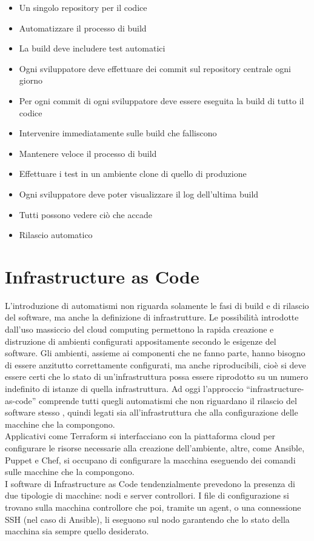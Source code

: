 \documentclass[a4paper, 12pt]{report}
\numberwithin{equation}{section}
\begin{document}
\begin{itemize}
    \item Un singolo repository per il codice
    \item Automatizzare il processo di build
    \item La build deve includere test automatici
    \item Ogni sviluppatore deve effettuare dei commit sul repository centrale ogni giorno
    \item Per ogni commit di ogni sviluppatore deve essere eseguita la build di tutto il codice
    \item Intervenire immediatamente sulle build che falliscono
    \item Mantenere veloce il processo di build
    \item Effettuare i test in un ambiente clone di quello di produzione
    \item Ogni sviluppatore deve poter visualizzare il log dell'ultima build
    \item Tutti possono vedere ciò che accade
    \item Rilascio automatico
\end{itemize}
\section{Infrastructure as Code}
L’introduzione di automatismi non riguarda solamente le fasi di build e di rilascio del software, ma anche la definizione di infrastrutture. Le possibilità introdotte dall’uso massiccio del cloud computing permettono la rapida creazione e distruzione di ambienti configurati appositamente secondo le esigenze del software. Gli ambienti, assieme ai componenti che ne fanno parte, hanno bisogno di essere anzitutto correttamente configurati, ma anche riproducibili, cioè si deve essere certi che lo stato di un’infrastruttura possa essere riprodotto su un numero indefinito di istanze di quella infrastruttura.
Ad oggi l'approccio “infrastructure-as-code” comprende tutti quegli automatismi che non riguardano il rilascio del software stesso \cite{hutterman-iac}, quindi legati sia all'infrastruttura che alla configurazione delle macchine che la compongono.\\
Applicativi come Terraform si interfacciano con la piattaforma cloud per configurare le risorse necessarie alla creazione dell’ambiente, altre, come Ansible, Puppet e Chef, si occupano di configurare la macchina eseguendo dei comandi sulle macchine che la compongono.\\
I software di Infrastructure as Code tendenzialmente prevedono la presenza di due tipologie di macchine: nodi e server controllori. I file di configurazione si trovano sulla macchina controllore che poi, tramite un agent, o una connessione SSH (nel caso di Ansible), li eseguono sul nodo garantendo che lo stato della macchina sia sempre quello desiderato.
\end{document}
